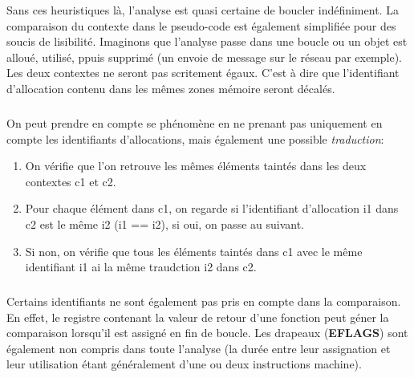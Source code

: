 Sans ces heuristiques là, l'analyse est quasi certaine de boucler indéfiniment. La comparaison du contexte dans le pseudo-code est également simplifiée pour des soucis de lisibilité.
Imaginons que l'analyse passe dans une boucle ou un objet est alloué, utilisé, ppuis supprimé (un envoie de message sur le réseau par exemple). Les deux contextes
ne seront pas scritement égaux. C'est à dire que l'identifiant d'allocation contenu dans les mêmes zones mémoire seront décalés.
\subparagraph{}
On peut prendre en compte se phénomène en ne prenant pas uniquement en compte les identifiants d'allocations, mais également une possible \textit{traduction}:
\begin{enumerate}
    \item On vérifie que l'on retrouve les mêmes éléments taintés dans les deux contextes c1 et c2.
    \item Pour chaque élément dans c1, on regarde si l'identifiant d'allocation i1 dans c2 est le même i2 (i1 == i2), si oui, on passe au suivant.
    \item Si non, on vérifie que tous les éléments taintés dans c1 avec le même identifiant i1 ai la même traudction i2 dans c2.
\end{enumerate}
\subparagraph{}
Certains identifiants ne sont également pas pris en compte dans la comparaison. En effet, le registre contenant la valeur de retour d'une fonction peut géner la comparaison
lorsqu'il est assigné en fin de boucle. Les drapeaux (\textbf{EFLAGS}) sont également non compris dans toute l'analyse (la durée entre leur assignation et leur utilisation étant généralement d'une
ou deux instructions machine).


